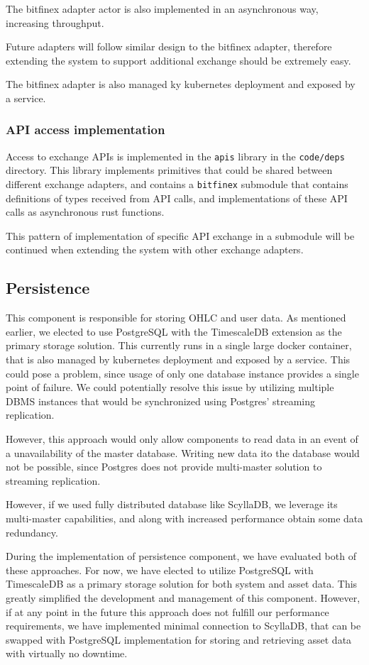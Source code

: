 The bitfinex adapter actor is also implemented in an asynchronous way, increasing throughput.

Future adapters will follow similar design to the bitfinex adapter, therefore
extending the system to support additional exchange should be extremely easy.

The bitfinex adapter is also managed ky kubernetes deployment and exposed by a service.

\subsubsection{API access implementation}
Access to exchange APIs is implemented in the \verb|apis| library in the \verb|code/deps| directory. This library implements
primitives that could be shared between different exchange adapters, and contains a \verb|bitfinex| submodule that contains
definitions of types received from API calls, and implementations of these API calls as asynchronous rust functions.

This pattern of implementation of specific API exchange in a submodule will be continued when extending the system
with other exchange adapters.


\subsection{Persistence}
This component is responsible for storing OHLC and user data. As mentioned earlier, we elected to use PostgreSQL
with the TimescaleDB extension as the primary storage solution. This currently runs in a single large docker
container, that is also managed by kubernetes deployment and exposed by a service. This could pose a problem,
since usage of only one database instance provides a single point of failure. We could potentially resolve
this issue by utilizing multiple DBMS instances that would be synchronized using Postgres' streaming replication.

However, this approach would only allow components to read data in an event of a unavailability of the master
database. Writing new data ito the database would not be possible, since Postgres does not provide multi-master
solution to streaming replication.

However, if we used fully distributed database like ScyllaDB, we leverage its multi-master capabilities, and
along with increased performance obtain some data redundancy.

During the implementation of persistence component, we have evaluated both of these approaches. For now,
we have elected to utilize PostgreSQL with TimescaleDB as a primary storage solution for both system and asset data.
This greatly simplified the development and management of this component. However, if at any point in the future
this approach does not fulfill our performance requirements, we have implemented minimal connection to ScyllaDB, that
can be swapped with PostgreSQL implementation for storing and retrieving asset data with virtually no downtime.


